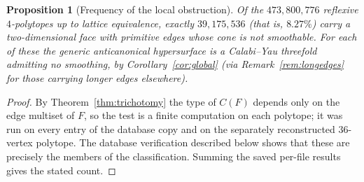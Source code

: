 \documentclass[11pt]{amsart}
\newtheorem{proposition}[theorem]{Proposition}
\theoremstyle{definition}
\theoremstyle{remark}
\begin{document}
\begin{proposition}[Frequency of the local obstruction]\label{prop:scan}
Of the $473{,}800{,}776$ reflexive $4$-polytopes up to lattice equivalence,
exactly $39{,}175{,}536$
(that is, $8.27\%$) carry a two-dimensional face with primitive edges whose
cone is not smoothable.  For each of these the generic anticanonical
hypersurface is a Calabi--Yau threefold admitting no smoothing, by
Corollary~\textup{\ref{cor:global}} \textup{(}via
Remark~\textup{\ref{rem:longedges}} for those carrying longer edges
elsewhere\textup{)}.
\end{proposition}

\begin{proof}
By Theorem~\ref{thm:trichotomy} the type of $C(F)$ depends only on the edge
multiset of $F$, so the test is a finite computation on each polytope; it was
run on every entry of the database copy and on the separately reconstructed
$36$-vertex polytope.  The database verification described below shows that
these are precisely the members of the classification.  Summing the saved
per-file results gives the stated count.
\end{proof}
\end{document}
